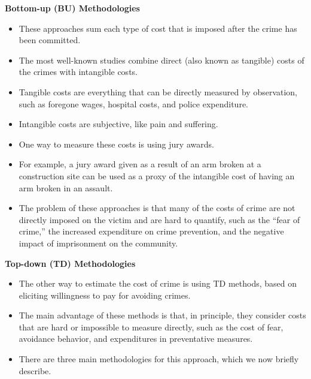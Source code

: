 \documentclass[static]{JJH-Beamer}
\begin{document}
\begin{frame}
 \addtocounter{framenumber}{-1}

\begin{center}
\textbf{Bottom-up (BU) Methodologies}
\end{center}
\begin{itemize}
\item These approaches sum each type of cost that is imposed after the crime has been committed.
\item The most well-known studies combine direct (also known as tangible) costs of the crimes with intangible costs.
\item Tangible costs are everything that can be directly measured by observation, such as foregone wages, hospital costs, and police expenditure.
\item Intangible costs are subjective, like pain and suffering.
\item One way to measure these costs is using jury awards.
\item For example, a jury award given as a result of an arm broken at a construction site can be used as a proxy of the intangible cost of having an arm broken in an assault.
\item The problem of these approaches is that many of the costs of crime are not directly imposed on the victim and are hard to quantify, such as the ``fear of crime,'' the increased expenditure on crime prevention, and the negative impact of imprisonment on the community.
\end{itemize}

\end{frame}

\begin{frame}
 \addtocounter{framenumber}{-1}

\begin{center}
\textbf{Top-down (TD) Methodologies}
\end{center}
\begin{itemize}
\item The other way to estimate the cost of crime is using TD methods, based on eliciting willingness to pay for avoiding crimes.
\item The main advantage of these methods is that, in principle, they consider costs that are hard or impossible to measure directly, such as the cost of fear, avoidance behavior, and expenditures in preventative measures.
\item There are three main methodologies for this approach, which we now briefly describe.
\end{itemize}

\end{frame}
\end{document}
